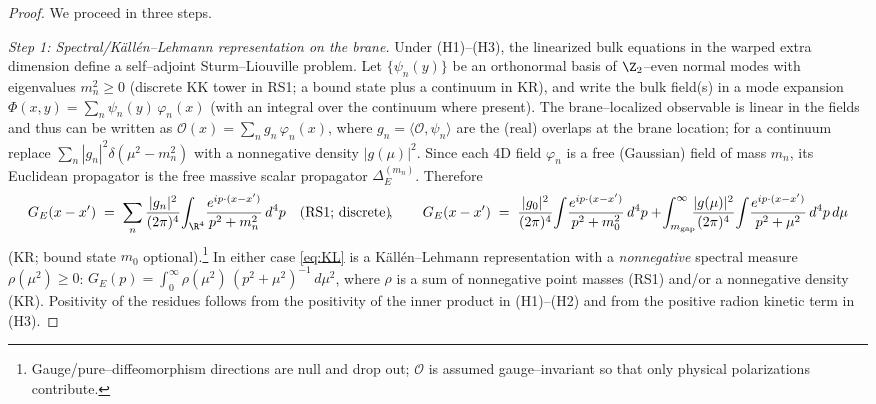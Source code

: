 \documentclass[10pt]{article}
\theoremstyle{definition}
\theoremstyle{plain}
\begin{document}
\begin{proof}
We proceed in three steps.

\emph{Step 1: Spectral/Käll\'en–Lehmann representation on the brane.}
Under \textnormal{(H1)}–\textnormal{(H3)}, the linearized bulk equations in the warped extra dimension
define a self–adjoint Sturm–Liouville problem. Let $\{\psi_n(y)\}$ be an orthonormal basis of
$\Z_2$–even normal modes with eigenvalues $m_n^2\ge 0$ (discrete KK tower in RS1; a bound state
plus a continuum in KR), and write the bulk field(s) in a mode expansion
$\Phi(x,y)=\sum_n \psi_n(y)\,\varphi_n(x)$ (with an integral over the continuum where present).
The brane--localized observable is linear in the fields and thus can be written as
$\mathcal O(x)=\sum_n g_n\,\varphi_n(x)$, where $g_n=\langle \mathcal O, \psi_n\rangle$
are the (real) overlaps at the brane location; for a continuum replace $\sum_n |g_n|^2\delta(\mu^2-m_n^2)$
with a nonnegative density $|g(\mu)|^2$.
Since each 4D field $\varphi_n$ is a free (Gaussian) field of mass $m_n$, its Euclidean propagator
is the free massive scalar propagator $\Delta_E^{(m_n)}$. Therefore
\begin{equation}
\label{eq:KL}
G_E(x-x')\;=\;\sum_{n}\frac{|g_n|^2}{(2\pi)^4}\!\int_{\R^4}\!\frac{e^{ip\cdot(x-x')}}{p^2+m_n^2}\,d^4p
\quad\text{(RS1; discrete)}\!,
\qquad
G_E(x-x')\;=\;\frac{|g_0|^2}{(2\pi)^4}\!\int\!\frac{e^{ip\cdot(x-x')}}{p^2+m_0^2}\,d^4p
+\!\int_{m_{\rm gap}}^\infty\!\!\!\frac{|g(\mu)|^2}{(2\pi)^4}\!\int\!\frac{e^{ip\cdot(x-x')}}{p^2+\mu^2}\,d^4p\,d\mu
\end{equation}
(KR; bound state $m_0$ optional).\footnote{Gauge/pure–diffeomorphism directions are null and drop out;
$\mathcal O$ is assumed gauge–invariant so that only physical polarizations contribute.}
In either case \eqref{eq:KL} is a Käll\'en–Lehmann representation \cite{WeinbergQFTvol1} with a \emph{nonnegative} spectral measure
$\rho(\mu^2)\ge 0$:
\(
G_E(p)=\int_0^\infty \rho(\mu^2)\,(p^2+\mu^2)^{-1}\,d\mu^2
\),
where $\rho$ is a sum of nonnegative point masses (RS1) and/or a nonnegative density (KR).
Positivity of the residues follows from the positivity of the inner product in \textnormal{(H1)}–\textnormal{(H2)}
and from the positive radion kinetic term in \textnormal{(H3)}.


\end{proof}
\end{document}
